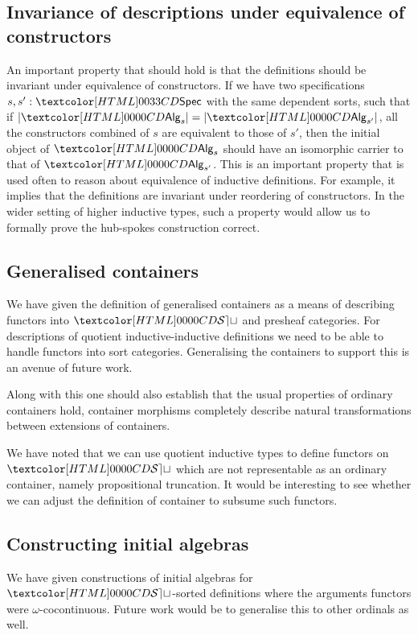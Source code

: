 \subsection{Invariance of descriptions under equivalence of constructors}

An important property that should hold is that the definitions should
be invariant under equivalence of constructors. If we have two
specifications $s, s' : \specty$ with the same dependent sorts, such
that if $| \Alg_s | = | \Alg_{s'} |$, \ie all the constructors
combined of $s$ are equivalent to those of $s'$, then the initial
object of $\Alg_s$ should have an isomorphic carrier to that of
$\Alg_{s'}$. This is an important property that is used often to
reason about equivalence of inductive definitions. For example, it
implies that the definitions are invariant under reordering of
constructors. In the wider setting of higher inductive types, such a
property would allow us to formally prove the hub-spokes construction
correct.

\subsection{Generalised containers}

We have given the definition of generalised containers as a means of
describing functors into $\SET$ and presheaf categories. For
descriptions of quotient inductive-inductive definitions we need to be
able to handle functors into sort categories. Generalising the
containers to support this is an avenue of future work.

Along with this one should also establish that the usual properties of
ordinary containers hold, \ie container morphisms completely describe
natural transformations between extensions of containers.

We have noted that we can use quotient inductive types to define
functors on $\SET$ which are not representable as an ordinary
container, namely propositional truncation. It would be interesting to
see whether we can adjust the definition of container to subsume such
functors.

\subsection{Constructing initial algebras}

We have given constructions of initial algebras for $\SET$-sorted
definitions where the arguments functors were
$\omega$-cocontinuous. Future work would be to generalise this to
other ordinals as well.

